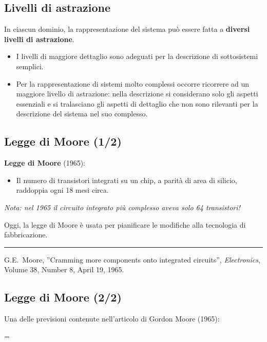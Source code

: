 \documentclass[10pt,a4paper,twoside,twocolumn]{article}
\begin{document}
\subsection{Livelli di astrazione}
In ciascun dominio, la rappresentazione del sistema pu\`o essere fatta a
\color{red} \textbf{diversi livelli di astrazione}\color{black}.

\begin{itemize}
\item 
I livelli di maggiore dettaglio sono adeguati per la descrizione 
di sottosistemi semplici.
\item 
Per la rappresentazione di sistemi molto complessi occorre ricorrere 
ad un maggiore livello di astrazione: 
nella descrizione si considerano solo gli aspetti essenziali e 
si tralasciano gli aspetti di dettaglio che non sono rilevanti per la descrizione 
del sistema nel suo complesso.
\end{itemize}



\subsection{Legge di Moore (1/2)}
\textbf{Legge di Moore} (1965):
\begin{itemize}
\item \color{red}
Il numero di transistori integrati su un chip, a parit\`a di area di silicio, 
raddoppia ogni 18 mesi circa.\color{black}
\end{itemize}
\emph{Nota: nel 1965 il circuito integrato pi\`u complesso aveva solo 64 transistori!}

Oggi, la legge di Moore \`e usata per pianificare le modifiche 
alla tecnologia di fabbricazione.
\vspace{5mm}

\hrule
\vspace{3mm}

{\footnotesize
G.E.~Moore, ''Cramming more components onto integrated circuits'', \emph{Electronics}, Volume 38, Number 8, April 19, 1965.
}



\subsection{Legge di Moore (2/2)}
Una delle previsioni contenute nell'articolo di Gordon Moore (1965):
\begin{center}
\epsfxsize = \columnwidth
{}
\end{center}
\vspace{5mm}
\end{document}
